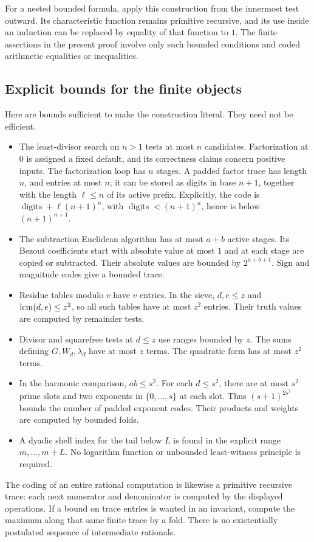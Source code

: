 For a nested bounded formula, apply this construction from the innermost
test outward. Its characteristic function remains primitive recursive,
and its use inside an induction can be replaced by equality of that
function to \(1\). The finite assertions in the present proof involve
only such bounded conditions and coded arithmetic equalities or
inequalities.

\subsection{Explicit bounds for the finite objects}

Here are bounds sufficient to make the construction literal.
They need not be efficient.
\begin{itemize}
\item The least-divisor search on \(n>1\) tests at most \(n\) candidates.
Factorization at \(0\) is assigned a fixed default, and its correctness
claims concern positive inputs. The factorization loop has \(n\) stages.
A padded factor trace has length
\(n\), and entries at most \(n\); it can be stored as digits in base \(n+1\),
together with the length \(\ell\le n\) of its active prefix. Explicitly,
the code is \(\operatorname{digits}+\ell(n+1)^n\), with
\(\operatorname{digits}<(n+1)^n\), hence is below \((n+1)^{n+1}\).
\item The subtraction Euclidean algorithm has at most \(a+b\) active
stages. Its Bezout coefficients start with absolute value at most \(1\)
and at each stage are copied or subtracted. Their absolute values are
bounded by \(2^{a+b+1}\). Sign and magnitude codes give a bounded trace.
\item Residue tables modulo \(v\) have \(v\) entries. In the sieve,
\(d,e\le z\) and \(\operatorname{lcm}(d,e)\le z^2\), so all such tables have at most
\(z^2\) entries. Their truth values are computed by remainder tests.
\item Divisor and squarefree tests at \(d\le z\) use ranges bounded by
\(z\). The sums defining \(G,W_d,\lambda_d\) have at most \(z\) terms.
The quadratic form has at most \(z^2\) terms.
\item In the harmonic comparison, \(ab\le s^2\).
For each \(d\le s^2\), there are at most \(s^2\) prime slots and
two exponents in \(\{0,\ldots,s\}\) at each slot.
Thus \((s+1)^{2s^2}\) bounds the number of padded exponent codes.
Their products and weights are computed by bounded folds.
\item A dyadic shell index for the tail below \(L\) is found in the
explicit range \(m,\ldots,m+L\). No logarithm function or unbounded
least-witness principle is required.
\end{itemize}
The coding of an entire rational computation is likewise a primitive
recursive trace: each next numerator and denominator is computed by the
displayed operations. If a bound on trace entries is wanted in an
invariant, compute the maximum along that same finite trace by a fold.
There is no existentially postulated sequence of intermediate rationals.

